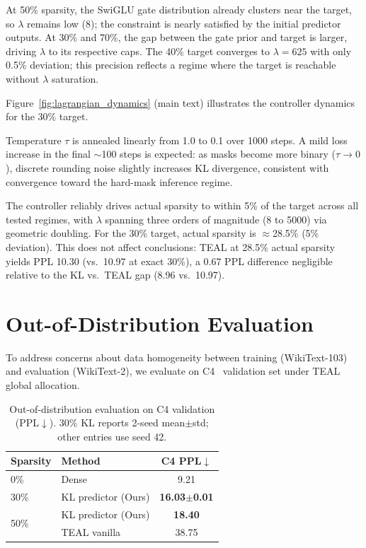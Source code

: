 At 50\% sparsity, the SwiGLU gate distribution already clusters near the target, so $\lambda$ remains low (8); the constraint is nearly satisfied by the initial predictor outputs.
At 30\% and 70\%, the gap between the gate prior and target is larger, driving $\lambda$ to its respective caps.
The 40\% target converges to $\lambda = 625$ with only 0.5\% deviation; this precision reflects a regime where the target is reachable without $\lambda$ saturation.

Figure~\ref{fig:lagrangian_dynamics} (main text) illustrates the controller dynamics for the 30\% target.

Temperature $\tau$ is annealed linearly from 1.0 to 0.1 over 1000 steps.
A mild loss increase in the final $\sim$100 steps is expected: as masks become more binary ($\tau \to 0$), discrete rounding noise slightly increases KL divergence, consistent with convergence toward the hard-mask inference regime.

The controller reliably drives actual sparsity to within 5\% of the target across all tested regimes, with $\lambda$ spanning three orders of magnitude (8 to 5000) via geometric doubling.
For the 30\% target, actual sparsity is $\approx$28.5\% (5\% deviation). This does not affect conclusions: TEAL at 28.5\% actual sparsity yields PPL 10.30 (vs.\ 10.97 at exact 30\%), a 0.67 PPL difference negligible relative to the KL vs.\ TEAL gap (8.96 vs.\ 10.97).


\section{Out-of-Distribution Evaluation}
\label{app:ood}

To address concerns about data homogeneity between training (WikiText-103) and evaluation (WikiText-2), we evaluate on C4~\cite{raffel2020c4} validation set under TEAL global allocation.

\begin{table}[h]
\centering
\caption{Out-of-distribution evaluation on C4 validation (PPL$\downarrow$). 30\% KL reports 2-seed mean$\pm$std; other entries use seed 42.}
\label{tab:ood}
\small
\begin{tabular}{llc}
\toprule
Sparsity & Method & C4 PPL$\downarrow$ \\
\midrule
0\% & Dense & 9.21 \\
\midrule
30\% & KL predictor (Ours) & \textbf{16.03$\pm$0.01} \\
\midrule
\multirow{2}{*}{50\%} & KL predictor (Ours) & \textbf{18.40} \\
& TEAL vanilla & 38.75 \\
\bottomrule
\end{tabular}
\end{table}

